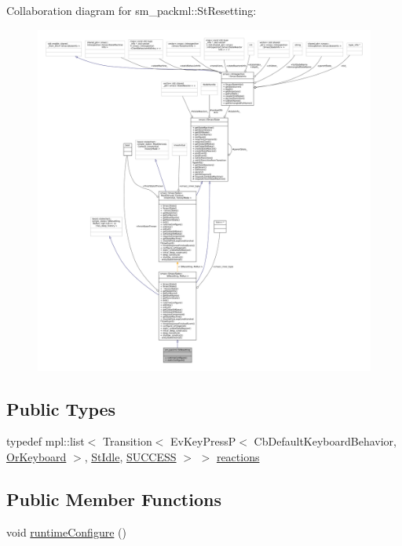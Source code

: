 Collaboration diagram for sm\+\_\+packml\+:\+:St\+Resetting\+:
\nopagebreak
\begin{figure}[H]
\begin{center}
\leavevmode
\includegraphics[width=350pt]{structsm__packml_1_1StResetting__coll__graph}
\end{center}
\end{figure}
\subsection*{Public Types}
\begin{DoxyCompactItemize}
\item 
typedef mpl\+::list$<$ Transition$<$ Ev\+Key\+PressP$<$ Cb\+Default\+Keyboard\+Behavior, \hyperlink{classsm__packml_1_1OrKeyboard}{Or\+Keyboard} $>$, \hyperlink{structsm__packml_1_1StIdle}{St\+Idle}, \hyperlink{classSUCCESS}{S\+U\+C\+C\+E\+SS} $>$ $>$ \hyperlink{structsm__packml_1_1StResetting_a57233fed0eba5f99e5926f1363359a31}{reactions}
\end{DoxyCompactItemize}
\subsection*{Public Member Functions}
\begin{DoxyCompactItemize}
\item 
void \hyperlink{structsm__packml_1_1StResetting_a842772ce8ae203e4837d9b8bd0f8152b}{runtime\+Configure} ()
\end{DoxyCompactItemize}
